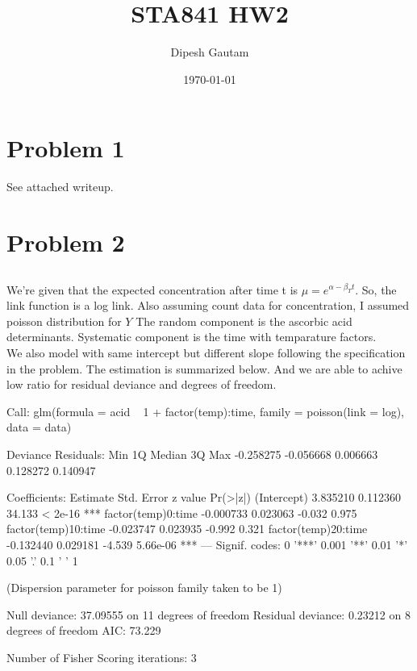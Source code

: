 \documentclass{article}
\begin{document}

\title{STA841 HW2}
\author{Dipesh Gautam}
\date{\today}
\maketitle


\section{Problem 1}
See attached writeup.

\section{Problem 2}
\subsection{}
We're given that the expected concentration after time t is $\mu = e^{\alpha -\beta_Tt}$. So, the link function is a log link. Also assuming count data for concentration, I assumed poisson distribution for $Y$
The random component is the ascorbic acid determinants. Systematic component is the time with temparature factors.\\
We also model with same intercept but different slope following the specification in the problem. The estimation is summarized below. And we are able to achive low ratio for residual deviance and degrees of freedom.
\begin{Schunk}
\begin{Soutput}
Call:
glm(formula = acid ~ 1 + factor(temp):time, family = poisson(link = log), 
    data = data)

Deviance Residuals: 
      Min         1Q     Median         3Q        Max  
-0.258275  -0.056668   0.006663   0.128272   0.140947  

Coefficients:
                     Estimate Std. Error z value Pr(>|z|)    
(Intercept)          3.835210   0.112360  34.133  < 2e-16 ***
factor(temp)0:time  -0.000733   0.023063  -0.032    0.975    
factor(temp)10:time -0.023747   0.023935  -0.992    0.321    
factor(temp)20:time -0.132440   0.029181  -4.539 5.66e-06 ***
---
Signif. codes:  0 '***' 0.001 '**' 0.01 '*' 0.05 '.' 0.1 ' ' 1

(Dispersion parameter for poisson family taken to be 1)

    Null deviance: 37.09555  on 11  degrees of freedom
Residual deviance:  0.23212  on  8  degrees of freedom
AIC: 73.229

Number of Fisher Scoring iterations: 3
\end{Soutput}
\end{Schunk}
\end{document}
